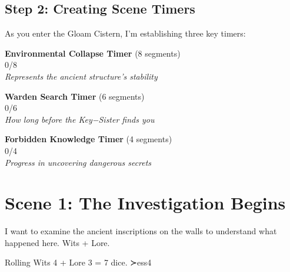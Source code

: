 \documentclass[11pt]{article}
\begin{document}

\subsection*{Step 2: Creating Scene Timers}

 As you enter the Gloam Cistern, I'm establishing three key timers:

\begin{center}
\textbf{Environmental Collapse Timer } (8 segments)\\
\fbox{\timersegment\timersegment\timersegment\timersegment\timersegment\timersegment\timersegment\timersegment} 0/8\\
\textit{Represents the ancient structure's stability}
\end{center}

\begin{center}
\textbf{Warden Search Timer } (6 segments)\\
\fbox{\timersegment\timersegment\timersegment\timersegment\timersegment\timersegment} 0/6\\
\textit{How long before the Key−Sister finds you}
\end{center}

\begin{center}
\textbf{Forbidden Knowledge Timer } (4 segments)\\
\fbox{\timersegment\timersegment\timersegment\timersegment} 0/4\\
\textit{Progress in uncovering dangerous secrets}
\end{center}


\section*{Scene 1: The Investigation Begins}

 I want to examine the ancient inscriptions on the walls to understand what happened here. Wits + Lore.


 Rolling Wits 4 + Lore 3 = 7 dice.  ≻ess{4} 
\end{document}
